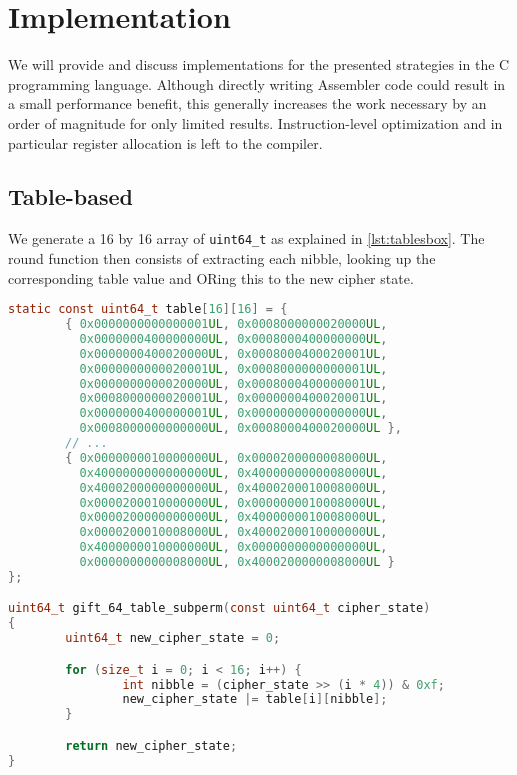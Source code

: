 \chapter{Implementation}

We will provide and discuss implementations for the presented strategies in the
C programming language. Although directly writing Assembler code could result
in a small performance benefit, this generally increases the work necessary by
an order of magnitude for only limited results. Instruction-level optimization
and in particular register allocation is left to the compiler.

\section{Table-based}

We generate a 16 by 16 array of \texttt{uint64\_t} as explained in \ref{lst:tablesbox}.
The round function then consists of extracting each nibble, looking up the
corresponding table value and ORing this to the new cipher state.

\begin{lstlisting}[caption={Table-based round function}, language=c]
static const uint64_t table[16][16] = {
        { 0x0000000000000001UL, 0x0008000000020000UL,
          0x0000000400000000UL, 0x0008000400000000UL,
          0x0000000400020000UL, 0x0008000400020001UL,
          0x0000000000020001UL, 0x0008000000000001UL,
          0x0000000000020000UL, 0x0008000400000001UL,
          0x0008000000020001UL, 0x0000000400020001UL,
          0x0000000400000001UL, 0x0000000000000000UL,
          0x0008000000000000UL, 0x0008000400020000UL },
        // ...
        { 0x0000000010000000UL, 0x0000200000008000UL,
          0x4000000000000000UL, 0x4000000000008000UL,
          0x4000200000000000UL, 0x4000200010008000UL,
          0x0000200010000000UL, 0x0000000010008000UL,
          0x0000200000000000UL, 0x4000000010008000UL,
          0x0000200010008000UL, 0x4000200010000000UL,
          0x4000000010000000UL, 0x0000000000000000UL,
          0x0000000000008000UL, 0x4000200000008000UL }
};

uint64_t gift_64_table_subperm(const uint64_t cipher_state)
{
        uint64_t new_cipher_state = 0;

        for (size_t i = 0; i < 16; i++) {
                int nibble = (cipher_state >> (i * 4)) & 0xf;
                new_cipher_state |= table[i][nibble];
        }

        return new_cipher_state;
}
\end{lstlisting}

